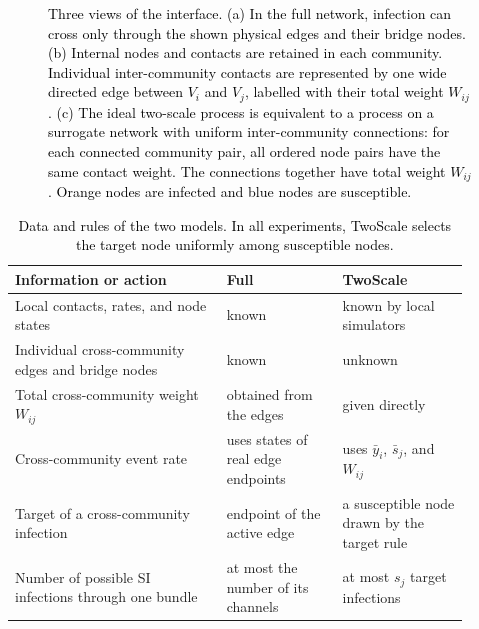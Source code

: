 \documentclass{ieeeaccess}
\newcommand{\ibar}{\bar{y}}
\newcommand{\sbar}{\bar{s}}
\newcommand{\Full}{\textup{Full}}
\newcommand{\TS}{\textup{TwoScale}}
\begin{document}
\begin{figure}[!tbp]
\caption{\textcolor{black}{Three views of the interface. (a) In the full network, infection can cross only through the shown physical edges and their bridge nodes. (b) Internal nodes and contacts are retained in each community. Individual inter-community contacts are represented by one wide directed edge between $V_i$ and $V_j$, labelled with their total weight $W_{ij}$. (c) The ideal two-scale process is equivalent to a process on a surrogate network with uniform inter-community connections: for each connected community pair, all ordered node pairs have the same contact weight. The connections together have total weight $W_{ij}$. Orange nodes are infected and blue nodes are susceptible.}}
\label{fig:schematic}
\end{figure}

\begin{table}[!t]
\color{black}
\centering
\caption{\textcolor{black}{Data and rules of the two models. In all experiments, \TS{} selects the target node uniformly among susceptible nodes.}}
\label{tab:information}
\small
\begin{tabular}{>{\raggedright\arraybackslash}p{0.42\linewidth}>{\raggedright\arraybackslash}p{0.23\linewidth}>{\raggedright\arraybackslash}p{0.25\linewidth}}
\toprule
Information or action & \Full{} & \TS{}\\
\midrule
Local contacts, rates, and node states & known & known by local simulators\\
Individual cross-community edges and bridge nodes & known & unknown\\
Total cross-community weight $W_{ij}$ & obtained from the edges & given directly\\
Cross-community event rate & uses states of real edge endpoints & uses $\ibar_i$, $\sbar_j$, and $W_{ij}$\\
Target of a cross-community infection & endpoint of the active edge & a susceptible node drawn by the target rule\\
Number of possible SI infections through one bundle & at most the number of its channels & at most $s_j$ target infections\\
\bottomrule
\end{tabular}
\end{table}
\end{document}

